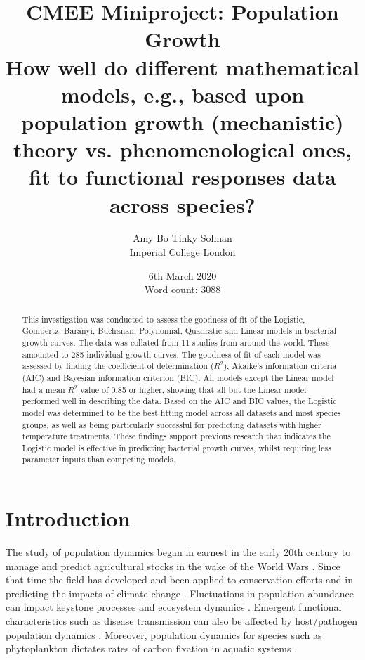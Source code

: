 \documentclass[titlepage]{article}
\title{CMEE Miniproject: Population Growth \\ 
\large How well do different mathematical models, e.g., based upon population growth (mechanistic) theory vs. phenomenological ones, fit to functional responses data across species?}
\author{Amy Bo Tinky Solman\\
Imperial College London}
\date{6th March 2020\\
Word count: 3088}
\begin{document}
\maketitle

\begin{abstract}
    \centering
    This investigation was conducted to assess the goodness of fit of the Logistic, Gompertz, Baranyi, Buchanan, Polynomial, Quadratic and Linear models in bacterial growth curves. The data was collated from 11 studies from around the world. These amounted to 285 individual growth curves. The goodness of fit of each model was assessed by finding the coefficient of determination ($R^2$), Akaike's information criteria (AIC) and Bayesian information criterion (BIC). All models except the Linear model had a mean $R^2$ value of 0.85 or higher, showing that all but the Linear model performed well in describing the data. Based on the AIC and BIC values, the Logistic model was determined to be the best fitting model across all datasets and most species groups, as well as being particularly successful for predicting datasets with higher temperature treatments. These findings support previous research that indicates the Logistic model is effective in predicting bacterial growth curves, whilst requiring less parameter inputs than competing models.
\end{abstract}

\section{Introduction}

The study of population dynamics began in earnest in the early 20th century to manage and predict agricultural stocks in the wake of the World Wars \cite{KingslandSharonE1995Mn:e}. Since that time the field has developed and been applied to conservation efforts and in predicting the impacts of climate change \cite{ozgul2010coupled} \cite{hunter2010climate}. Fluctuations in population abundance can impact keystone processes and ecosystem dynamics \cite{sinclair2003mammal}. Emergent functional characteristics such as disease transmission can also be affected by host/pathogen population dynamics \cite{alexander1996population}. Moreover, population dynamics for species such as phytoplankton dictates rates of carbon fixation in aquatic systems \cite{reynolds2000regulation}.\ 
\end{document}
